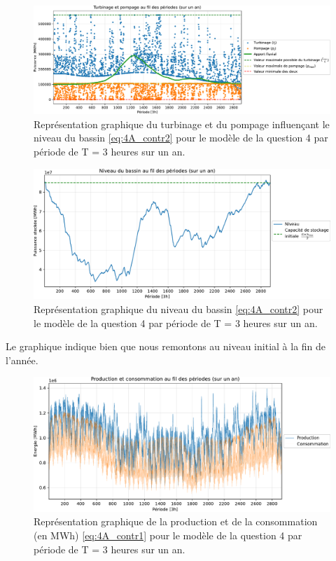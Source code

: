 \documentclass{article}
\begin{document}
\begin{figure}[h!]
    \centering
    \includegraphics[scale=0.6]{GraphesP2/Turbinage_pompage_Q4.pdf}
    \caption{Représentation graphique du turbinage et du pompage
    influençant le niveau du bassin \eqref{eq:4A_contr2} pour le modèle de la question 4 par période de T = 3 heures sur un an.}
    \label{fig:Turbinage_pompage_Q4}
\end{figure}
\newpage
\begin{figure}[h!]
    \centering
    \includegraphics[scale=0.6]{GraphesP2/Niveau_Bassin_Q4.pdf}
    \caption{Représentation graphique du niveau du bassin \eqref{eq:4A_contr2} pour le modèle 
    de la question 4 par période de T = 3 heures sur un an.}
    \label{fig:Niveau_bassin_Q4}
\end{figure}
\noindent Le graphique indique bien que nous remontons au niveau initial à la fin de l'année. \\

\begin{figure}[h!]
    \centering
    \includegraphics[scale=0.6]{GraphesP2/Prod_Cons_Q4.pdf}
    \caption{Représentation graphique de la production et de la consommation (en MWh) \eqref{eq:4A_contr1} pour le modèle de la question 4 
    par période de T = 3 heures sur un an.}
    \label{fig:Prod_Cons_Q4}
\end{figure}
\end{document}
